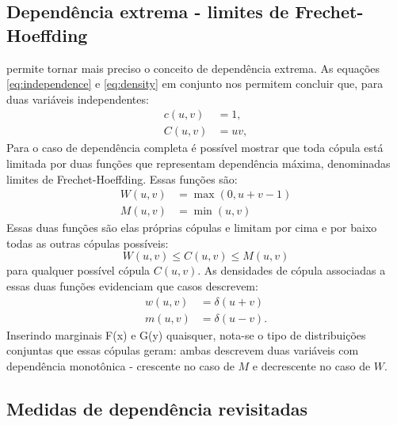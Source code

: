 \subsection{Dependência extrema - limites de Frechet-Hoeffding}

 permite tornar mais preciso o conceito de dependência extrema. As equações \eqref{eq:independence} e \eqref{eq:density} em conjunto nos permitem concluir que, para duas variáveis independentes:
\begin{align}
c(u,v) &= 1, \\
C(u,v) &= uv,
\end{align}
Para o caso de dependência completa é possível mostrar que\cite{Nelsen2006} toda cópula está limitada por duas funções que representam dependência máxima, denominadas limites de Frechet-Hoeffding. Essas funções são:
\begin{align}
\label{eq:frechethoeffding}
W(u,v) &= \max(0, u+v-1) \\
M(u,v) &= \min(u,v)
\end{align}
Essas duas funções são elas próprias cópulas e limitam por cima e por baixo todas as outras cópulas possíveis:
\begin{equation}
W\left(u,v\right) \le C(u,v) \le M(u,v)  
\end{equation}
para qualquer possível cópula $C(u,v)$. As densidades de cópula associadas a essas duas funções evidenciam que casos descrevem:
\begin{align}
w(u,v) &= \delta(u+v) \\
m(u,v) &= \delta(u-v).
\end{align}
Inserindo marginais F(x) e G(y) quaisquer, nota-se o tipo de distribuições conjuntas que essas cópulas geram: ambas descrevem duas variáveis com dependência monotônica - crescente no caso de $M$ e decrescente no caso de $W$.

\subsection{Medidas de dependência revisitadas}


